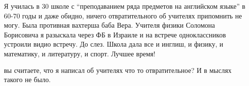 \begin{itemize}
\begin{itemize}
\end{itemize} %


Я училась в 30 школе с \enquote{преподаванием ряда предметов на английском языке} в
60-70 годы и даже обидно, ничего отвратительного об учителях припомнить не
могу. Была противная вахтерша баба Вера. Учителя физики Соломона Борисовича я
разыскала через ФБ в Израиле и на встрече одноклассников устроили видио
встречу. До слез. Школа дала все и инглиш, и физику, и математику, и
литературу, и спорт. Лучшее время!

\begin{itemize} %
вы считаете, что я написал об учителях что то отвратительное? И в мыслях такого не было.
\end{itemize} %

\end{itemize} %
